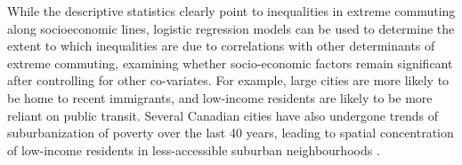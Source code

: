 \documentclass[10 pt,letterpaper]{article}
\begin{document}
While the descriptive statistics clearly point to inequalities in extreme commuting along socioeconomic lines, logistic regression models can be used to determine the extent to which inequalities are due to correlations with other determinants of extreme commuting, examining whether socio-economic factors remain significant after controlling for other co-variates. For example, large cities are more likely to be home to recent immigrants, and low-income residents are likely to be more reliant on public transit. Several Canadian cities have also undergone trends of suburbanization of poverty over the last 40 years, leading to spatial concentration of low-income residents in less-accessible suburban neighbourhoods \cite{ades_is_2016,grant_changing_2020}. 


\begin{table}[H]
	
	\caption{Percent of commuters who have one-way commute times greater than 60min, 75min, and 90min in Canada in 2016 (Part 1)}
	
	\vspace{1mm}
	
	\small
\end{table}
\end{document}
